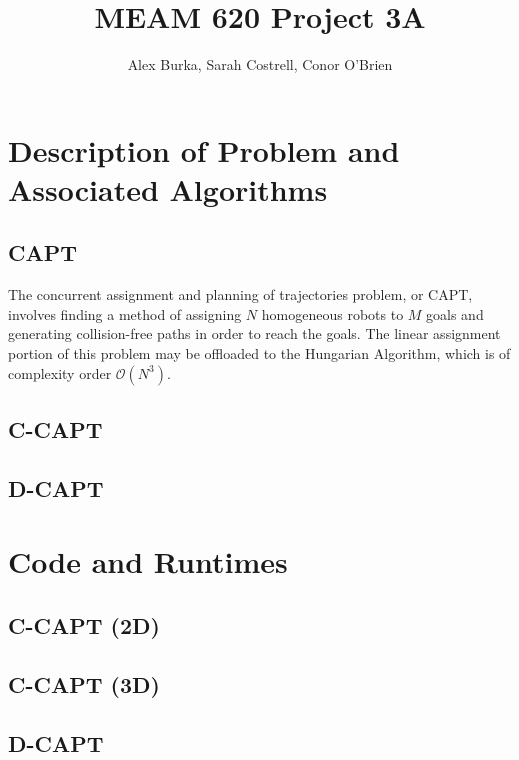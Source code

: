 \documentclass[11pt]{article}
\begin{document}
\author{Alex Burka, Sarah Costrell, Conor O'Brien}
\title{MEAM 620 Project 3A}
\maketitle

\section{Description of Problem and Associated Algorithms}

\subsection{CAPT}
The concurrent assignment and planning of trajectories problem, or CAPT, involves finding a method of assigning $N$ homogeneous robots to $M$ goals and generating collision-free paths in order to reach the goals. The linear assignment portion of this problem may be offloaded to the Hungarian Algorithm, which is of complexity order $\mathcal{O}(N^3)$.

\subsection{C-CAPT}


\subsection{D-CAPT}



\section{Code and Runtimes}
\subsection{C-CAPT (2D)}
\subsection{C-CAPT (3D)}
\subsection{D-CAPT}
\end{document}
